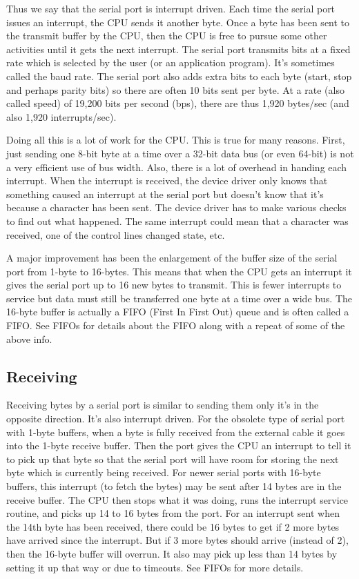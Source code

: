 \documentclass[11pt, twosides, titlepage]{article}
\begin{document}
        Thus we say that the serial port is interrupt driven. Each time the serial port issues an interrupt, the CPU sends it another byte. Once a byte has been sent to the transmit buffer by the CPU, then the CPU is free to pursue some other activities until it gets the next interrupt. The serial port transmits bits at a fixed rate which is selected by the user (or an application program). It's sometimes called the baud rate. The serial port also adds extra bits to each byte (start, stop and perhaps parity bits) so there are often 10 bits sent per byte. At a rate (also called speed) of 19,200 bits per second (bps), there are thus 1,920 bytes/sec (and also 1,920 interrupts/sec).

        Doing all this is a lot of work for the CPU. This is true for many reasons. First, just sending one 8-bit byte at a time over a 32-bit data bus (or even 64-bit) is not a very efficient use of bus width. Also, there is a lot of overhead in handing each interrupt. When the interrupt is received, the device driver only knows that something caused an interrupt at the serial port but doesn't know that it's because a character has been sent. The device driver has to make various checks to find out what happened. The same interrupt could mean that a character was received, one of the control lines changed state, etc.

        A major improvement has been the enlargement of the buffer size of the serial port from 1-byte to 16-bytes. This means that when the CPU gets an interrupt it gives the serial port up to 16 new bytes to transmit. This is fewer interrupts to service but data must still be transferred one byte at a time over a wide bus. The 16-byte buffer is actually a FIFO (First In First Out) queue and is often called a FIFO. See FIFOs for details about the FIFO along with a repeat of some of the above info.
        
    \subsection{Receiving}
        
        Receiving bytes by a serial port is similar to sending them only it's in the opposite direction. It's also interrupt driven. For the obsolete type of serial port with 1-byte buffers, when a byte is fully received from the external cable it goes into the 1-byte receive buffer. Then the port gives the CPU an interrupt to tell it to pick up that byte so that the serial port will have room for storing the next byte which is currently being received. For newer serial ports with 16-byte buffers, this interrupt (to fetch the bytes) may be sent after 14 bytes are in the receive buffer. The CPU then stops what it was doing, runs the interrupt service routine, and picks up 14 to 16 bytes from the port. For an interrupt sent when the 14th byte has been received, there could be 16 bytes to get if 2 more bytes have arrived since the interrupt. But if 3 more bytes should arrive (instead of 2), then the 16-byte buffer will overrun. It also may pick up less than 14 bytes by setting it up that way or due to timeouts. See FIFOs for more details.
\end{document}
